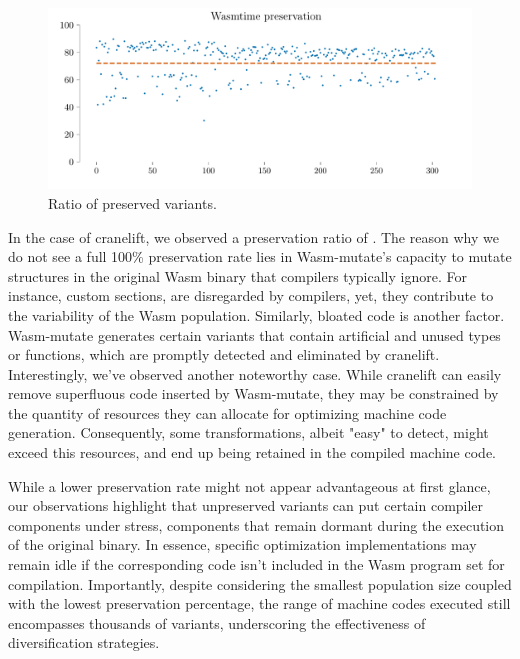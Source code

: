 \documentclass[sigplan,screen]{acmart}
\newcommand{\tool}{Wasm-mutate\xspace}
\newcommand{\wasm}{Wasm\xspace}
\begin{document}
\begin{figure}
    \centering
    \includegraphics[width=\linewidth]{plots/rq1/preservation.pdf}
    \caption{Ratio of preserved variants.}
  \label{rq1:plot:preservation}
\end{figure}

In the case of cranelift, we observed a preservation ratio of \preserved. 
The reason why we do not see a full 100\% preservation rate lies in \tool's capacity to mutate structures in the original \wasm binary that compilers typically ignore. 
For instance, custom sections, are disregarded by compilers, yet, they contribute to the variability of the \wasm population.
Similarly, bloated code is another factor. 
\tool generates certain variants that contain artificial and unused types or functions, which are promptly detected and eliminated by cranelift.
Interestingly, we've observed another noteworthy case.
While cranelift can easily remove superfluous code inserted by \tool, they may be constrained by the quantity of resources they can allocate for optimizing machine code generation. 
Consequently, some transformations, albeit "easy" to detect, might exceed this resources, and end up being retained in the compiled machine code.


While a lower preservation rate might not appear advantageous at first glance, our observations highlight that unpreserved variants can put certain compiler components under stress, components that remain dormant during the execution of the original binary. 
In essence, specific optimization implementations may remain idle if the corresponding code isn't included in the \wasm program set for compilation. 
Importantly, despite considering the smallest population size coupled with the lowest preservation percentage, the range of machine codes executed still encompasses thousands of variants, underscoring the effectiveness of diversification strategies.
\end{document}
